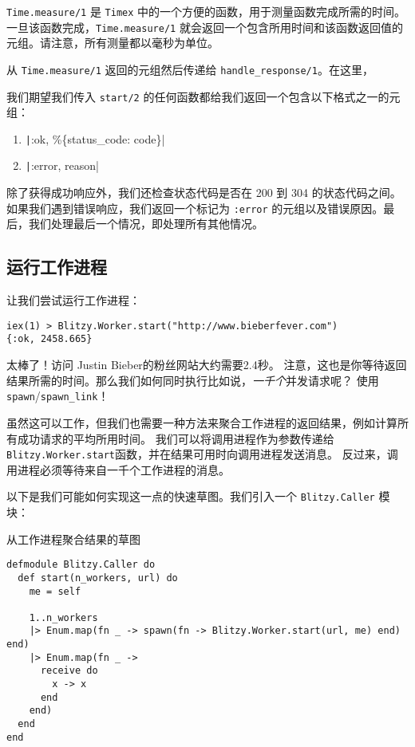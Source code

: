 \texttt{Time.measure/1} 是
\texttt{Timex}
中的一个方便的函数，用于测量函数完成所需的时间。一旦该函数完成，\texttt{Time.measure/1}
就会返回一个包含所用时间和该函数返回值的元组。请注意，所有测量都以毫秒为单位。

从 \texttt{Time.measure/1} 返回的元组然后传递给
\texttt{handle\_response/1}。在这里，

我们期望我们传入 \texttt{start/2}
的任何函数都给我们返回一个包含以下格式之一的元组：

\begin{enumerate}
	\item \texttt|{:ok, \%\{status_code: code\}}|
  \item \texttt|{:error, reason}|
\end{enumerate}

除了获得成功响应外，我们还检查状态代码是否在 200 到 304
的状态代码之间。如果我们遇到错误响应，我们返回一个标记为
\texttt{:error}
的元组以及错误原因。最后，我们处理最后一个情况，即处理所有其他情况。

\subsection{运行工作进程}

让我们尝试运行工作进程：

\begin{code}{}
\begin{verbatim}
iex(1) > Blitzy.Worker.start("http://www.bieberfever.com")
{:ok, 2458.665}
\end{verbatim}
\end{code}

太棒了！访问 Justin Bieber的粉丝网站大约需要2.4秒。
注意，这也是你等待返回结果所需的时间。那么我们如何同时执行比如说，\emph{一千个}并发请求呢？
使用\texttt{spawn}/\texttt{spawn\_link}！

虽然这可以工作，但我们也需要一种方法来聚合工作进程的返回结果，例如计算所有成功请求的平均所用时间。
我们可以将调用进程作为参数传递给\texttt{Blitzy.Worker.start}函数，并在结果可用时向调用进程发送消息。
反过来，调用进程必须等待来自一千个工作进程的消息。

以下是我们可能如何实现这一点的快速草图。我们引入一个
\texttt{Blitzy.Caller} 模块：

\begin{code}{从工作进程聚合结果的草图}

\begin{verbatim}
defmodule Blitzy.Caller do
  def start(n_workers, url) do
    me = self

    1..n_workers
    |> Enum.map(fn _ -> spawn(fn -> Blitzy.Worker.start(url, me) end) end)
    |> Enum.map(fn _ ->
      receive do
        x -> x
      end
    end)
  end
end
\end{verbatim}
\end{code}

